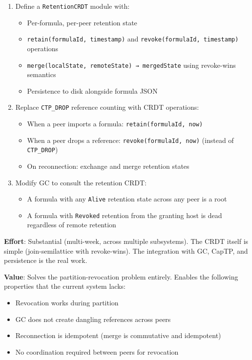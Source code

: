 \documentclass[11pt]{article}
\begin{document}
\begin{enumerate}
\item Define a \texttt{RetentionCRDT} module with:
\begin{itemize}
\item Per-formula, per-peer retention state
\item \texttt{retain(formulaId, timestamp)} and \texttt{revoke(formulaId, timestamp)} operations
\item \texttt{merge(localState, remoteState) → mergedState} using revoke-wins semantics
\item Persistence to disk alongside formula JSON
\end{itemize}

\item Replace \texttt{CTP\_DROP} reference counting with CRDT operations:
\begin{itemize}
\item When a peer imports a formula: \texttt{retain(formulaId, now)}
\item When a peer drops a reference: \texttt{revoke(formulaId, now)} (instead of \texttt{CTP\_DROP})
\item On reconnection: exchange and merge retention states
\end{itemize}

\item Modify GC to consult the retention CRDT:
\begin{itemize}
\item A formula with any \texttt{Alive} retention state across any peer is a root
\item A formula with \texttt{Revoked} retention from the granting host is dead
regardless of remote retention
\end{itemize}
\end{enumerate}

\textbf{Effort}: Substantial (multi-week, across multiple subsystems). The CRDT
itself is simple (join-semilattice with revoke-wins). The integration with
GC, CapTP, and persistence is the real work.

\textbf{Value}: Solves the partition-revocation problem entirely. Enables the
following properties that the current system lacks:
\begin{itemize}
\item Revocation works during partition
\item GC does not create dangling references across peers
\item Reconnection is idempotent (merge is commutative and idempotent)
\item No coordination required between peers for revocation
\end{itemize}
\end{document}
